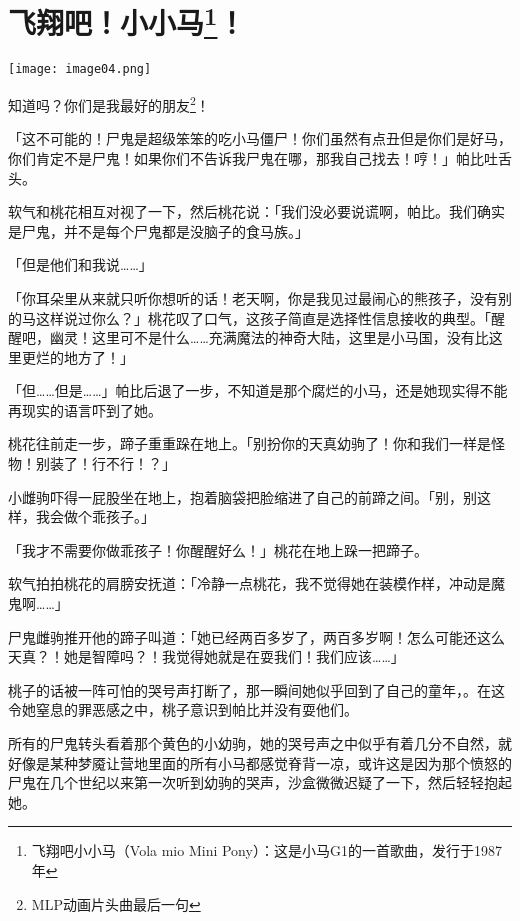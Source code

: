\chapter[飞翔吧！小小马！]{\texorpdfstring{飞翔吧！小小马\footnote{飞翔吧小小马（Vola mio Mini Pony）：这是小马G1的一首歌曲，发行于1987年}！}{飞翔吧！小小马！}}

\texttt{[image: image04.png]}


\begin{intro}
知道吗？你们是我最好的朋友\footnote{MLP动画片头曲最后一句}！
\end{intro}


「这不可能的！尸鬼是超级笨笨的吃小马僵尸！你们虽然有点丑但是你们是好马，你们肯定不是尸鬼！如果你们不告诉我尸鬼在哪，那我自己找去！哼！」帕比吐舌头。

软气和桃花相互对视了一下，然后桃花说：「我们没必要说谎啊，帕比。我们确实是尸鬼，并不是每个尸鬼都是没脑子的食马族。」

「但是他们和我说……」

「你耳朵里从来就只听你想听的话！老天啊，你是我见过最闹心的熊孩子，没有别的马这样说过你么？」桃花叹了口气，这孩子简直是选择性信息接收的典型。「醒醒吧，幽灵！这里可不是什么……充满魔法的神奇大陆，这里是小马国，没有比这里更烂的地方了！」

「但……但是……」帕比后退了一步，不知道是那个腐烂的小马，还是她现实得不能再现实的语言吓到了她。

桃花往前走一步，蹄子重重跺在地上。「别扮你的天真幼驹了！你和我们一样是怪物！别装了！行不行！？」

小雌驹吓得一屁股坐在地上，抱着脑袋把脸缩进了自己的前蹄之间。「别，别这样，我会做个乖孩子。」

「我才不需要你做乖孩子！你醒醒好么！」桃花在地上跺一把蹄子。

软气拍拍桃花的肩膀安抚道：「冷静一点桃花，我不觉得她在装模作样，冲动是魔鬼啊……」

尸鬼雌驹推开他的蹄子叫道：「她已经两百多岁了，两百多岁啊！怎么可能还这么天真？！她是智障吗？！我觉得她就是在耍我们！我们应该……」

桃子的话被一阵可怕的哭号声打断了，那一瞬间她似乎回到了自己的童年，。在这令她窒息的罪恶感之中，桃子意识到帕比并没有耍他们。

所有的尸鬼转头看着那个黄色的小幼驹，她的哭号声之中似乎有着几分不自然，就好像是某种梦魇让营地里面的所有小马都感觉脊背一凉，或许这是因为那个愤怒的尸鬼在几个世纪以来第一次听到幼驹的哭声，沙盒微微迟疑了一下，然后轻轻抱起她。

